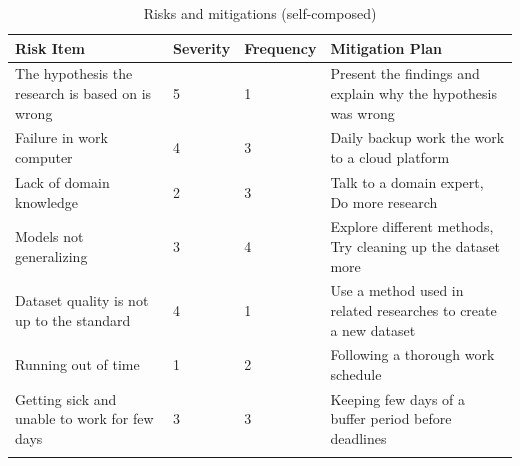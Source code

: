 \begin{longtable}{|p{4.8cm}|p{1.35cm}|p{1.8cm}|p{7cm}|}
    \hline
    \textbf{Risk Item} & 
    \textbf{Severity} & 
    \textbf{Frequency} & 
    \textbf{Mitigation Plan}
    \\ \hline
    
    The hypothesis the research is based on is wrong & 
    5 & 
    1 & 
    Present the findings and explain why the hypothesis was wrong 
    \\ \hline
    
    Failure in work computer & 
    4 & 
    3 & 
    Daily backup work the work to a cloud platform 
    \\ \hline
    
    Lack of domain knowledge & 
    2 & 
    3 & 
    Talk to a domain expert, Do more research 
    \\ \hline
    
    Models not generalizing & 
    3 & 
    4 & 
    Explore different methods, Try cleaning up the dataset more 
    \\ \hline
    
    Dataset quality is not up to the standard & 
    4 & 
    1 & 
    Use a method used in related researches to create a new dataset 
    \\ \hline
    
    Running out of time & 
    1 & 
    2 & 
    Following a thorough work schedule
    \\ \hline
    
    Getting sick and unable to work for few days & 
    3 & 
    3 & 
    Keeping few days of a buffer period before deadlines 
    \\ \hline
    \caption{Risks and mitigations (self-composed)}
\end{longtable}